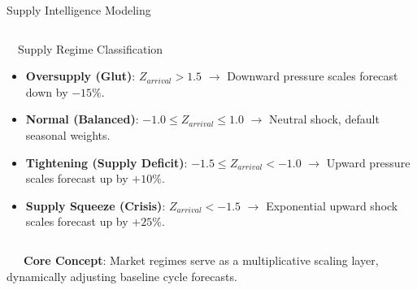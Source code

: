 \documentclass{beamer}
\begin{document}
\begin{frame}{Supply Intelligence Modeling}
\begin{columns}[T]
    \begin{column}{0.48\textwidth}
        \begin{orangecard}[height=4.6cm]{~~Supply Regime Classification}
            \fontsize{6.8pt}{8.2pt}\selectfont
            \begin{itemize}\setlength\itemsep{3pt}\setlength\parskip{0pt}
                \item \textbf{Oversupply (Glut)}:
                $Z_{arrival} > 1.5$ $\rightarrow$ Downward pressure scales forecast down by $-15\%$.
                \item \textbf{Normal (Balanced)}:
                $-1.0 \le Z_{arrival} \le 1.0$ $\rightarrow$ Neutral shock, default seasonal weights.
                \item \textbf{Tightening (Supply Deficit)}:
                $-1.5 \le Z_{arrival} < -1.0$ $\rightarrow$ Upward pressure scales forecast up by $+10\%$.
                \item \textbf{Supply Squeeze (Crisis)}:
                $Z_{arrival} < -1.5$ $\rightarrow$ Exponential upward shock scales forecast up by $+25\%$.
            \end{itemize}
        \end{orangecard}
    \end{column}
\end{columns}

\vspace{0.08cm}
\begin{tcolorbox}[enhanced, colback=primaryblue!4, colframe=primaryblue!30, boxrule=0.35pt,
  arc=3.5pt, width=0.98\textwidth, left=4pt, right=4pt, top=2.5pt, bottom=2.5pt, boxsep=0pt,
  halign=center, shadow={0.5pt}{-0.5pt}{0pt}{black!8}]
    \fontsize{5.5pt}{6.5pt}\selectfont
    \textcolor{primaryDark}{~~~\textbf{Core Concept}: Market regimes serve as a multiplicative scaling layer, dynamically adjusting baseline cycle forecasts.}
\end{tcolorbox}
\end{frame}
\end{document}
